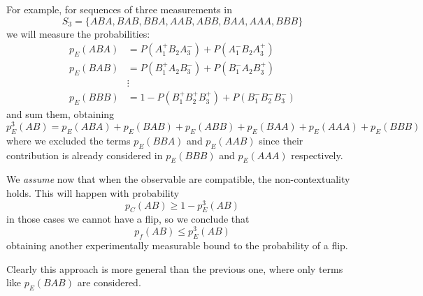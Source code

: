 \documentclass[a4paper]{article}
\newcommand{\abs}[1]{\lvert #1 \rvert}
\theoremstyle{definition}
\begin{document}
For example, for sequences of three measurements in
\begin{equation}
 S_3 =\{ABA,BAB,BBA,AAB,ABB,BAA,AAA,BBB\}    
\end{equation}
we will measure the probabilities:
\begin{align}
    p_E(ABA) &= P(A_1^+ B_2 A_3^-) + P(A_1^- B_2 A_3^+) \\ 
    p_E(BAB) &= P(B_1^+ A_2 B_3^-) + P(B_1^- A_2 B_3^+) \\ 
    &\vdots\\
    p_E(BBB) &= 1 - P(B_1^+ B_2^+ B_3^+) + P(B_1^- B_2^- B_3^-)
\end{align}
and sum them, obtaining
\begin{equation}
    p_E^3(AB) = p_E(ABA) + p_E(BAB) + p_E(ABB) + p_E(BAA) + p_E(AAA) + p_E(BBB)
\end{equation}
where we excluded the terms $p_E(BBA)$ and $p_E(AAB)$ since their contribution
is already considered in $p_E(BBB)$ and $p_E(AAA)$ respectively.

We \emph{assume} now that when the observable are compatible, the
non-contextuality holds.
This will happen with probability
\begin{equation}
    p_C(AB) \ge 1 - p_E^3(AB)
\end{equation}
in those cases we cannot have a flip, so we conclude that
\begin{equation}
    p_f(AB) \le p_E^3(AB)
    \label{eq:pe_ass2}
\end{equation}
obtaining another experimentally measurable bound to the probability of a flip.

Clearly this approach is more general than the previous one, where only terms
like $p_E(BAB)$ are considered.

%
\end{document}
